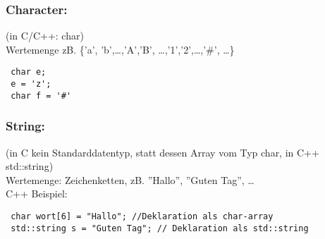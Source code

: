  \subsubsection{Character:} (in C/C++: char) \\
 Wertemenge zB. \{'a', 'b',\dots,'A','B', \dots,'1','2',\dots,'\#', \dots\}
 \begin{lstlisting}
 char e;
 e = 'z';
 char f = '#'
 \end{lstlisting}
 
 \subsubsection{String:} (in C kein Standarddatentyp, statt dessen Array vom Typ char, in C++ std::string) \\
 Wertemenge: Zeichenketten, zB. ''Hallo'', ''Guten Tag'', \dots \\
 C++ Beispiel:
 \begin{lstlisting}
 char wort[6] = "Hallo"; //Deklaration als char-array
 std::string s = "Guten Tag"; // Deklaration als std::string
 \end{lstlisting}
 
